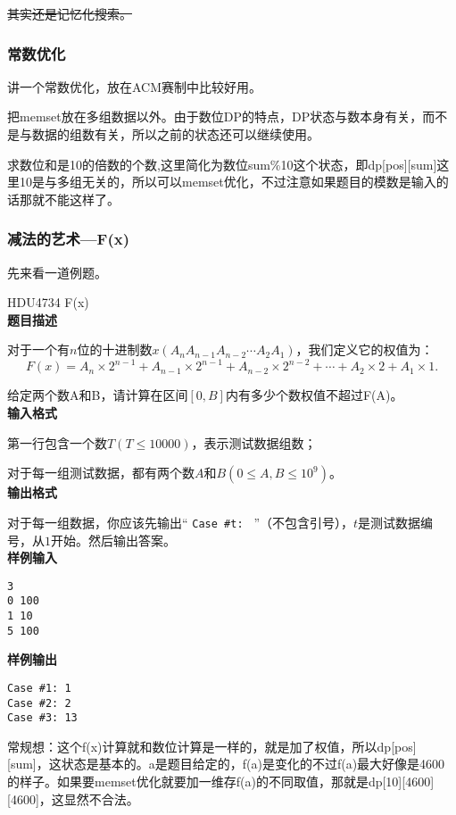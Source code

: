 	\sout{其实还是记忆化搜索。}
	\subsubsection{常数优化}
	讲一个常数优化，放在ACM赛制中比较好用。

	把memset放在多组数据以外。由于数位DP的特点，DP状态与数本身有关，而不是与数据的组数有关，所以之前的状态还可以继续使用。

	求数位和是10的倍数的个数,这里简化为数位sum\%10这个状态，即dp[pos][sum]这里10是与多组无关的，所以可以memset优化，不过注意如果题目的模数是输入的话那就不能这样了。
	\subsubsection{减法的艺术---F(x)}
	先来看一道例题。
	\begin{example} HDU4734 F(x)\\
	\textbf{题目描述}
	
	对于一个有$n$位的十进制数$x(A_nA_{n-1}A_{n-2}\cdots A_2A_1)$，我们定义它的权值为：
	\begin{equation*}
	F(x)=A_n\times 2^{n-1}+A_{n-1}\times 2^{n-1}+A_{n-2}\times 2^{n-2}+\cdots+A_2\times 2+A_1\times 1.
	\end{equation*}
	
给定两个数A和B，请计算在区间$[0,B]$内有多少个数权值不超过F(A)。\\
	\textbf{输入格式}
	
	第一行包含一个数$T(T\leq 10000)$，表示测试数据组数；
	
	对于每一组测试数据，都有两个数$A$和$B(0\leq A, B\leq 10^9)$。\\
	\textbf{输出格式}
	
	对于每一组数据，你应该先输出`` \verb+Case #t: + ''（不包含引号），$t$是测试数据编号，从$1$开始。然后输出答案。\\
	\textbf{样例输入}
\begin{verbatim}
3
0 100
1 10
5 100
\end{verbatim}
\textbf{样例输出}
\begin{verbatim}
Case #1: 1
Case #2: 2
Case #3: 13
\end{verbatim}
	\end{example}

常规想：这个f(x)计算就和数位计算是一样的，就是加了权值，所以dp[pos][sum]，这状态是基本的。a是题目给定的，f(a)是变化的不过f(a)最大好像是4600的样子。如果要memset优化就要加一维存f(a)的不同取值，那就是dp[10][4600][4600]，这显然不合法。

